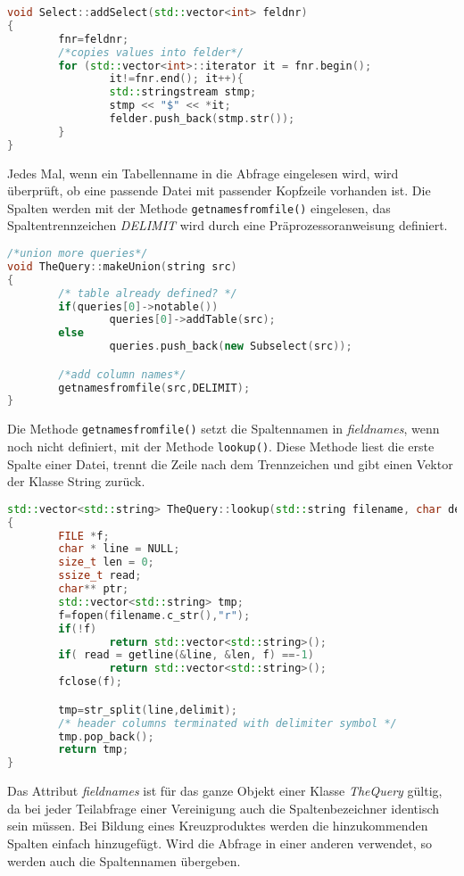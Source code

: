 \begin{lstlisting}[language=C++]
void Select::addSelect(std::vector<int> feldnr)
{
        fnr=feldnr;
        /*copies values into felder*/
        for (std::vector<int>::iterator it = fnr.begin();
                it!=fnr.end(); it++){
                std::stringstream stmp;
                stmp << "$" << *it;
                felder.push_back(stmp.str());
        }
}
\end{lstlisting}

Jedes Mal, wenn ein Tabellenname in die Abfrage eingelesen wird, wird überprüft, ob eine passende Datei mit passender Kopfzeile vorhanden ist. Die Spalten werden mit der Methode \lstinline{getnamesfromfile()} eingelesen, das Spaltentrennzeichen \textit{DELIMIT} wird durch eine Präprozessoranweisung definiert.

\begin{lstlisting}[language=C++]
/*union more queries*/
void TheQuery::makeUnion(string src)
{
        /* table already defined? */
        if(queries[0]->notable())
                queries[0]->addTable(src);
        else
                queries.push_back(new Subselect(src));

        /*add column names*/
        getnamesfromfile(src,DELIMIT);
}
\end{lstlisting}

Die Methode \lstinline{getnamesfromfile()} setzt die Spaltennamen in \textit{fieldnames}, wenn noch nicht definiert, mit der Methode \lstinline{lookup()}. Diese Methode liest die erste Spalte einer Datei, trennt die Zeile nach dem Trennzeichen und gibt einen Vektor der Klasse String zurück.
\begin{lstlisting}[language=C++]
std::vector<std::string> TheQuery::lookup(std::string filename, char delimit)
{
        FILE *f;
        char * line = NULL;
        size_t len = 0;
        ssize_t read;
        char** ptr;
        std::vector<std::string> tmp;
        f=fopen(filename.c_str(),"r");
        if(!f)
                return std::vector<std::string>();
        if( read = getline(&line, &len, f) ==-1)
                return std::vector<std::string>();
        fclose(f);

        tmp=str_split(line,delimit);
        /* header columns terminated with delimiter symbol */
        tmp.pop_back();
        return tmp;
}
\end{lstlisting}

Das Attribut \textit{fieldnames} ist für das ganze Objekt einer Klasse \textit{TheQuery} gültig, da bei jeder Teilabfrage einer Vereinigung auch die Spaltenbezeichner identisch sein müssen. Bei Bildung eines Kreuzproduktes werden die hinzukommenden Spalten einfach hinzugefügt. Wird die Abfrage in einer anderen verwendet, so werden auch die Spaltennamen übergeben.

